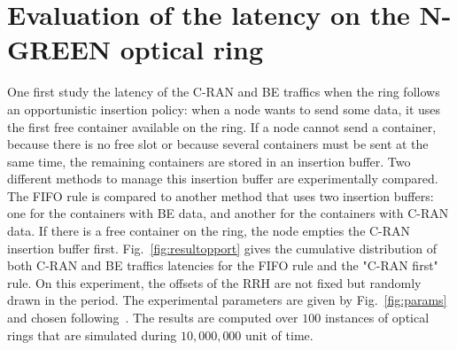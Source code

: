 \documentclass[]{algotel}
\begin{document}
% 
% 
%   

  
   \section{Evaluation of the latency on the N-GREEN optical ring}
   \label{sec:oportmethods}
   
   
   
  One first study the latency of the C-RAN and BE traffics when the ring follows an opportunistic insertion policy: when a node wants to send some data, it uses the first free container available on the ring. 
  If a node cannot send a container, because there is no free slot or because several containers must be sent at the same time, the remaining containers are stored in an insertion buffer. Two different methods to manage this insertion buffer are experimentally compared. The FIFO rule is compared to another method that uses two insertion buffers: one for the containers with BE data, and another for the containers with C-RAN data. If there is a free container on the ring, the node empties the C-RAN insertion buffer first.  Fig.~\ref{fig:resultopport} gives the cumulative distribution of both C-RAN and BE traffics latencies for the FIFO rule and the "C-RAN first" rule. On this experiment, the offsets of the RRH are not fixed but randomly drawn in the period. The experimental parameters are given by Fig.~\ref{fig:params} and chosen following~\cite{ngreenarchitecture}. The results are computed over $100$ instances of optical rings that are simulated during $10,000,000$ unit of time.
  
\end{document}
